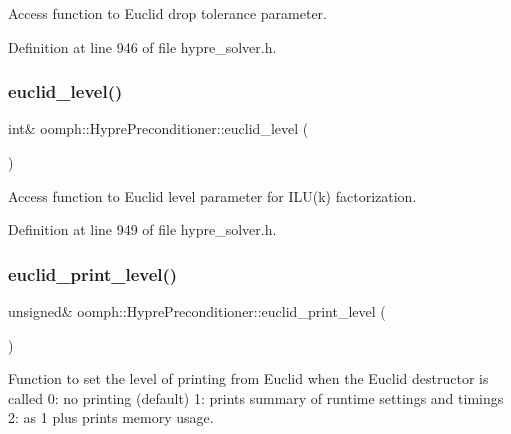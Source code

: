 Access function to Euclid drop tolerance parameter. 



Definition at line 946 of file hypre\+\_\+solver.\+h.

\mbox{\label{classoomph_1_1HyprePreconditioner_a6479953e74f0796384f456d7f9787fc5}} 
\subsubsection{\texorpdfstring{euclid\+\_\+level()}{euclid\_level()}}
{\footnotesize\ttfamily int\& oomph\+::\+Hypre\+Preconditioner\+::euclid\+\_\+level (\begin{DoxyParamCaption}{ }\end{DoxyParamCaption})\hspace{0.3cm}{\ttfamily [inline]}}



Access function to Euclid level parameter for I\+L\+U(k) factorization. 



Definition at line 949 of file hypre\+\_\+solver.\+h.

\mbox{\label{classoomph_1_1HyprePreconditioner_a8be8b1933ac9cc1a3b6f4977d92e615c}} 
\subsubsection{\texorpdfstring{euclid\+\_\+print\+\_\+level()}{euclid\_print\_level()}}
{\footnotesize\ttfamily unsigned\& oomph\+::\+Hypre\+Preconditioner\+::euclid\+\_\+print\+\_\+level (\begin{DoxyParamCaption}{ }\end{DoxyParamCaption})\hspace{0.3cm}{\ttfamily [inline]}}



Function to set the level of printing from Euclid when the Euclid destructor is called 0\+: no printing (default) 1\+: prints summary of runtime settings and timings 2\+: as 1 plus prints memory usage. 



